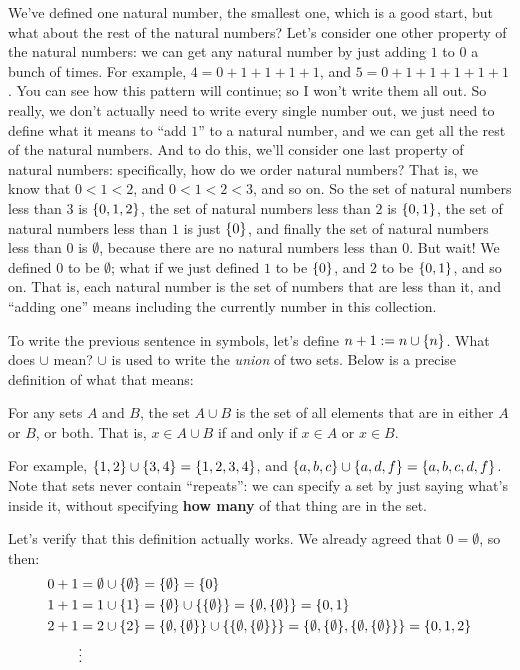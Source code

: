 We've defined one natural number, the smallest one, which is a good start, but what about the rest of the natural numbers?
Let's consider one other property of the natural numbers: we can get any natural number by just adding $1$ to $0$ a bunch of times.
For example, $4 = 0 + 1 + 1 + 1 + 1$, and $5 = 0 + 1 + 1 + 1 + 1 + 1$.
You can see how this pattern will continue; so I won't write them all out.
So really, we don't actually need to write every single number out, we just need to define what it means to ``add $1$'' to a natural number, and we can get all the rest of the natural numbers.
And to do this, we'll consider one last property of natural numbers: specifically, how do we order natural numbers?
That is, we know that $0 < 1 < 2$, and $0 < 1 < 2 < 3$, and so on.
So the set of natural numbers less than $3$ is ${\left\{ {0,1,2} \right\}}$, the set of natural numbers less than $2$ is ${\left\{ {0,1} \right\}}$, the set of natural numbers less than $1$ is just ${\left\{ {0} \right\}}$, and finally the set of natural numbers less than $0$ is $\emptyset$, because there are no natural numbers less than $0$.
But wait!
We defined $0$ to be $\emptyset$; what if we just defined $1$ to be ${\left\{ {0} \right\}}$, and $2$ to be ${\left\{ {0,1} \right\}}$, and so on.
That is, each natural number is the set of numbers that are less than it, and ``adding one'' means including the currently number in this collection.

To write the previous sentence in symbols, let's define $n + 1 := n \cup {\left\{ {n} \right\}}$.
What does $\cup$ mean?
$\cup$ is used to write the \emph{union} of two sets.
Below is a precise definition of what that means:

\begin{definition}
    For any sets $A$ and $B$, the set $A \cup B$ is the set of all elements that are in either $A$ or $B$, or both.
    That is, $x \in A \cup B$ if and only if $x \in A$ or $x \in B$.
\end{definition}

For example, ${\left\{ {1,2} \right\}} \cup {\left\{ {3,4} \right\}} = {\left\{ {1,2,3,4} \right\}}$, and ${\left\{ {a,b,c} \right\}} \cup {\left\{ {a,d,f} \right\}} = {\left\{ {a,b,c,d,f} \right\}}$.
Note that sets never contain ``repeats'': we can specify a set by just saying what's inside it, without specifying \textbf{how many} of that thing are in the set.

Let's verify that this definition actually works.
We already agreed that $0 = \emptyset$, so then:
\begin{align*}
    0 + 1 &= \emptyset \cup {\left\{ {\emptyset} \right\}} = {\left\{ {\emptyset} \right\}} = {\left\{ {0} \right\}} \\
    1 + 1 &= 1 \cup {\left\{ {1} \right\}} = {\left\{ {\emptyset} \right\}} \cup {\left\{ {\ensuremath{{\left\{ {\emptyset} \right\}}}} \right\}} = {\left\{ {\emptyset, {\left\{ {\emptyset} \right\}}} \right\}} = {\left\{ {0, 1} \right\}} \\
    2 + 1 &= 2 \cup {\left\{ {2} \right\}} = {\left\{ {\emptyset, {\left\{ {\emptyset} \right\}}} \right\}} \cup {\left\{ {\ensuremath{{\left\{ {\emptyset, {\left\{ {\emptyset} \right\}}} \right\}}}} \right\}} = {\left\{ {\emptyset, {\left\{ {\emptyset} \right\}}, {\left\{ {\emptyset, {\left\{ {\emptyset} \right\}}} \right\}}} \right\}} = {\left\{ {0, 1, 2} \right\}} \\
    &\vdots
\end{align*}


